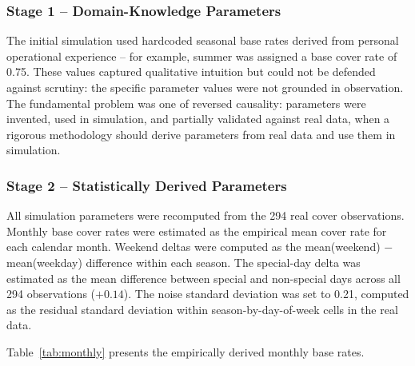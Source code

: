 \documentclass[12pt,a4paper,oneside]{article}
\begin{document}
\subsubsection{Stage 1  --  Domain-Knowledge Parameters}

The initial simulation used hardcoded seasonal base rates derived from personal operational experience -- for example, summer was assigned a base cover rate of 0.75. These values captured qualitative intuition but could not be defended against scrutiny: the specific parameter values were not grounded in observation. The fundamental problem was one of reversed causality: parameters were invented, used in simulation, and partially validated against real data, when a rigorous methodology should derive parameters from real data and use them in simulation.

\subsubsection{Stage 2  --  Statistically Derived Parameters}

All simulation parameters were recomputed from the 294 real cover observations. Monthly base cover rates were estimated as the empirical mean cover rate for each calendar month. Weekend deltas were computed as the mean(weekend) $-$ mean(weekday) difference within each season. The special-day delta was estimated as the mean difference between special and non-special days across all 294 observations ($+0.14$). The noise standard deviation was set to 0.21, computed as the residual standard deviation within season-by-day-of-week cells in the real data.

Table~\ref{tab:monthly} presents the empirically derived monthly base rates.
\end{document}
